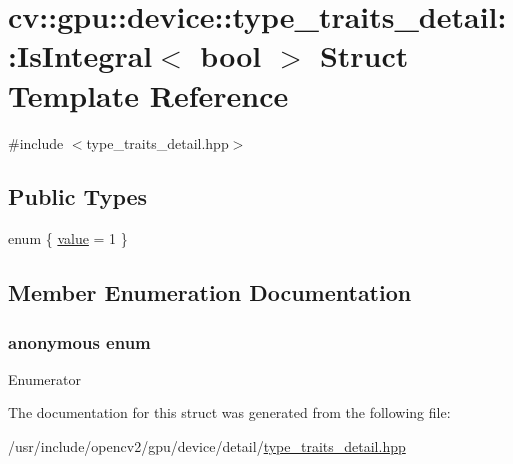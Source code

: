 \hypertarget{structcv_1_1gpu_1_1device_1_1type__traits__detail_1_1IsIntegral_3_01bool_01_4}{\section{cv\-:\-:gpu\-:\-:device\-:\-:type\-\_\-traits\-\_\-detail\-:\-:Is\-Integral$<$ bool $>$ Struct Template Reference}
\label{structcv_1_1gpu_1_1device_1_1type__traits__detail_1_1IsIntegral_3_01bool_01_4}
}


{\ttfamily \#include $<$type\-\_\-traits\-\_\-detail.\-hpp$>$}

\subsection*{Public Types}
\begin{DoxyCompactItemize}
\item 
enum \{ \hyperlink{structcv_1_1gpu_1_1device_1_1type__traits__detail_1_1IsIntegral_3_01bool_01_4_a540345720ea5e42eb5338d1e4c461529af2166b88fa9a24216584406c0567a93f}{value} = 1
 \}
\end{DoxyCompactItemize}


\subsection{Member Enumeration Documentation}
\hypertarget{structcv_1_1gpu_1_1device_1_1type__traits__detail_1_1IsIntegral_3_01bool_01_4_a540345720ea5e42eb5338d1e4c461529}{\subsubsection[{anonymous enum}]{\setlength{\rightskip}{0pt plus 5cm}anonymous enum}}\label{structcv_1_1gpu_1_1device_1_1type__traits__detail_1_1IsIntegral_3_01bool_01_4_a540345720ea5e42eb5338d1e4c461529}
\begin{Desc}
\item[Enumerator]\par
\begin{description}
\item[{\em 
\hypertarget{structcv_1_1gpu_1_1device_1_1type__traits__detail_1_1IsIntegral_3_01bool_01_4_a540345720ea5e42eb5338d1e4c461529af2166b88fa9a24216584406c0567a93f}{value}\label{structcv_1_1gpu_1_1device_1_1type__traits__detail_1_1IsIntegral_3_01bool_01_4_a540345720ea5e42eb5338d1e4c461529af2166b88fa9a24216584406c0567a93f}
}]\end{description}
\end{Desc}


The documentation for this struct was generated from the following file\-:\begin{DoxyCompactItemize}
\item 
/usr/include/opencv2/gpu/device/detail/\hyperlink{type__traits__detail_8hpp}{type\-\_\-traits\-\_\-detail.\-hpp}\end{DoxyCompactItemize}
